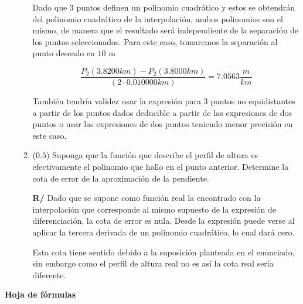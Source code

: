 \documentclass[12pt]{article}
\begin{document}
\begin{enumerate}[leftmargin=*,widest=9]
\begin{enumerate}[label=\alph*]
Dado que 3 puntos definen un polinomio cuadrático y estos se obtendrán del polinomio cuadrático de la interpolación, ambos polinomios son el mismo, de manera que el resultado será independiente de la separación de los puntos seleccionados. Para este caso, tomaremos la separación al punto deseado en \(10\) m

\[ \frac{P_2(3.8200 km) - P_2(3.8000 km)}{(2 \cdot 0.010000 km)} = 7.0563 \frac{m}{km}\]

También tendría validez usar la expresión para 3 puntos no equidistantes a partir de los puntos dados deducible a partir de las expresiones de dos puntos o usar las expresiones de dos puntos teniendo menor precisión en este caso.

   \item (\(0.5\)) Suponga que la función que describe el perfil de altura es efectivamente el polinomio que hallo en el punto anterior. Determine la cota de error de la aproximación de la pendiente.

   \textbf{R/} Dado que se supone como función real la encontrado con la interpolación que corresponde al mismo supuesto de la expresión de diferenciación, la cota de error es nula. Desde la expresión puede verse al aplicar la tercera derivada de un polinomio cuadrático, lo cual dará cero.

   Esta cota tiene sentido debido a la suposición planteada en el enunciado, sin embargo como el perfil de altura real no es así la cota real sería diferente.
   \end{enumerate}

\end{enumerate}
\begin{center}
\textbf{Hoja de fórmulas}
\end{center}
\end{document}
